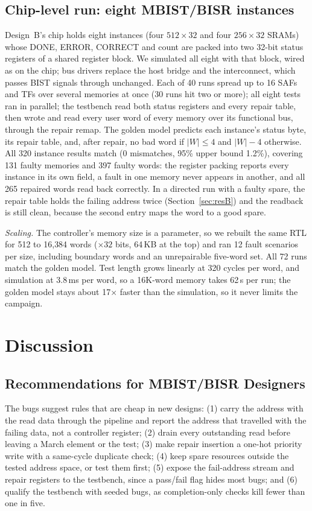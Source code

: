 \documentclass[conference]{IEEEtran}
\begin{document}
\subsection{Chip-level run: eight MBIST/BISR instances}
\label{sec:sys}
Design~B's chip holds eight instances (four $512\times32$ and four $256\times32$ SRAMs) whose DONE,
ERROR, CORRECT and count are packed into two 32-bit status registers of a shared register block.
We simulated all eight with that block, wired as on the chip; bus drivers replace the host bridge
and the interconnect, which passes BIST signals through unchanged. Each of 40 runs spread up to 16
SAFs and TFs over several memories at once (30 runs hit two or more); all eight tests ran in
parallel; the testbench read both status registers and every repair table, then wrote and read
every user word of every memory over its functional bus, through the repair remap. The golden model predicts each instance's status byte, its repair
table, and, after repair, no bad word if $|W|\le4$ and $|W|-4$ otherwise. All 320 instance results
match (0 mismatches, 95\% upper bound 1.2\%), covering 131 faulty memories and 397 faulty words:
the register packing reports every instance in its own field, a fault in one memory never appears
in another, and all 265 repaired words read back correctly. In a directed run with a faulty spare,
the repair table holds the failing address twice (Section~\ref{sec:resB}) and the readback is
still clean, because the second entry maps the word to a good spare.

\textit{Scaling.} The controller's memory size is a parameter, so we rebuilt the same RTL for
512 to 16{,}384 words ($\times32$ bits, 64\,KB at the top) and ran 12 fault scenarios per size,
including boundary words and an unrepairable five-word set. All 72 runs match the golden model.
Test length grows linearly at 320 cycles per word, and simulation at 3.8\,ms per word, so a
16K-word memory takes 62\,s per run; the golden model stays about 17$\times$ faster than the
simulation, so it never limits the campaign.

\section{Discussion}
\label{sec:disc}
\subsection{Recommendations for MBIST/BISR Designers}
The bugs suggest rules that are cheap in new designs: (1) carry the address with the read data
through the pipeline and report the address that travelled with the failing data, not a
controller register; (2) drain every outstanding read before leaving a March element or the test;
(3) make repair insertion a one-hot priority write with a same-cycle duplicate check; (4) keep
spare resources outside the tested address space, or test them first; (5) expose the fail-address
stream and repair registers to the testbench, since a pass/fail flag hides most bugs; and (6)
qualify the testbench with seeded bugs, as completion-only checks kill fewer than one in five.
\end{document}
